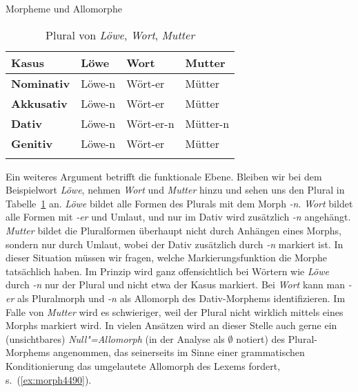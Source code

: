 \begin{Vertiefung}{Morpheme und Allomorphe}
\begin{table}[!htbp]
  \begin{tabular}{llll}
	\lsptoprule
    \textbf{Kasus} & \textbf{Löwe} & \textbf{Wort} & \textbf{Mutter} \\
    \midrule
     \textbf{Nominativ} & Löwe-n & Wört-er   & Mütter   \\
     \textbf{Akkusativ} & Löwe-n & Wört-er   & Mütter   \\
     \textbf{Dativ}     & Löwe-n & Wört-er-n & Mütter-n \\
     \textbf{Genitiv}   & Löwe-n & Wört-er   & Mütter   \\
    \lspbottomrule
  \end{tabular}
  \caption{Plural von \textit{Löwe}, \textit{Wort}, \textit{Mutter}}
  \label{tab:pluralbeispielmorpheme}
\end{table}

Ein weiteres Argument betrifft die funktionale Ebene.
Bleiben wir bei dem Beispielwort \textit{Löwe}, nehmen \textit{Wort} und \textit{Mutter} hinzu und sehen uns den Plural in Tabelle~\ref{tab:pluralbeispielmorpheme} an.
\textit{Löwe} bildet alle Formen des Plurals mit dem Morph \textit{-n}.
\textit{Wort} bildet alle Formen mit \textit{-er} und Umlaut, und nur im Dativ wird zusätzlich \textit{-n} angehängt.
\textit{Mutter} bildet die Pluralformen überhaupt nicht durch Anhängen eines Morphs, sondern nur durch Umlaut, wobei der Dativ zusätzlich durch \textit{-n} markiert ist.
In dieser Situation müssen wir fragen, welche Markierungsfunktion die Morphe tatsächlich haben.
Im Prinzip wird ganz offensichtlich bei Wörtern wie \textit{Löwe} durch \textit{-n} nur der Plural und nicht etwa der Kasus markiert.
Bei \textit{Wort} kann man \textit{-er} als Pluralmorph und \textit{-n} als Allomorph des Dativ-Morphems identifizieren.
Im Falle von \textit{Mutter} wird es schwieriger, weil der Plural nicht wirklich mittels eines Morphs markiert wird.
In vielen Ansätzen wird an dieser Stelle auch gerne ein (unsichtbares) \textit{Null"=Allomorph} (in der Analyse \zB als $\emptyset$ notiert) des Plural-Morphems angenommen, das seinerseits im Sinne einer grammatischen Konditionierung das umgelautete Allomorph des Lexems fordert, s.\ (\ref{ex:morph4490}).

\begin{exe}
\end{exe}


\end{Vertiefung}
